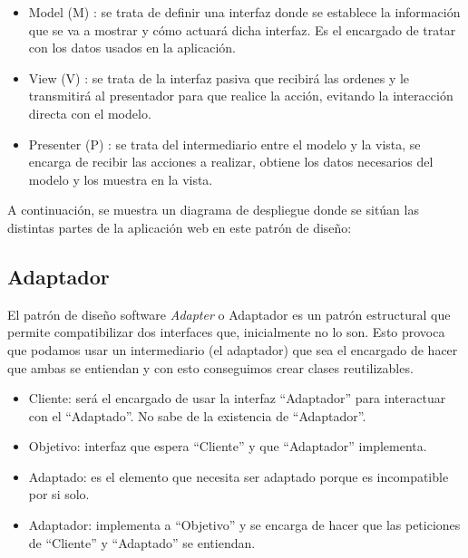 \begin{itemize}
    \item Model (M) \cite{mvp:online}: se trata de definir una interfaz donde se establece la información que se va a mostrar y cómo actuará dicha interfaz. Es el encargado de tratar con los datos usados en la aplicación.
    \item View (V) \cite{mvp:online}: se trata de la interfaz pasiva que recibirá las ordenes y le transmitirá al presentador para que realice la acción, evitando la interacción directa con el modelo.
    \item Presenter (P) \cite{mvp:online}: se trata del intermediario entre el modelo y la vista, se encarga de recibir las acciones a realizar, obtiene los datos necesarios del modelo y los muestra en la vista.
\end{itemize}


A continuación, se muestra un diagrama de despliegue donde se sitúan las distintas partes de la aplicación web en este patrón de diseño:

\subsection{Adaptador}
El patrón de diseño software \textit{Adapter} o Adaptador \cite{apuntesDMStema2} es un patrón estructural que permite compatibilizar dos interfaces que, inicialmente no lo son. Esto provoca que podamos usar un intermediario (el adaptador) que sea el encargado de hacer que ambas se entiendan y con esto conseguimos crear clases reutilizables.

\begin{itemize}
    \item Cliente: será el encargado de usar la interfaz ``Adaptador'' para interactuar con el ``Adaptado''. No sabe de la existencia de ``Adaptador''.
    \item Objetivo: interfaz que espera ``Cliente'' y que ``Adaptador'' implementa.
    \item Adaptado: es el elemento que necesita ser adaptado porque es incompatible por si solo.
    \item Adaptador: implementa a ``Objetivo'' y se encarga de hacer que las peticiones de ``Cliente'' y ``Adaptado'' se entiendan.
\end{itemize}

